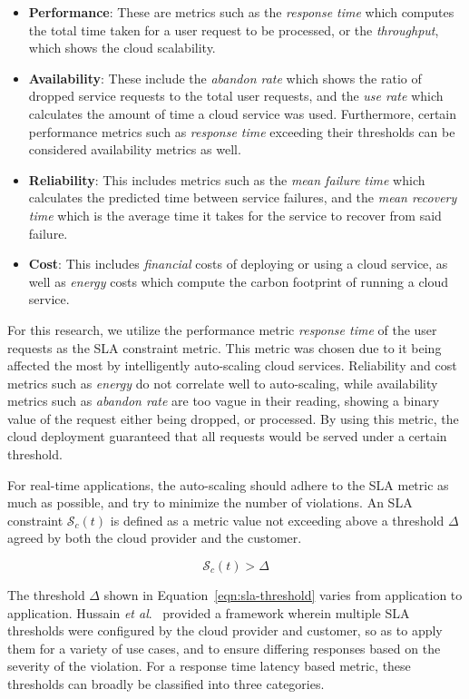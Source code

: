 \begin{itemize}
    \item \textbf{Performance}: These are metrics such as the \textit{response time} which computes the total time taken for a user request to be processed, or the \textit{throughput}, which shows the cloud scalability.
    \item \textbf{Availability}: These include the \textit{abandon rate} which shows the ratio of dropped service requests to the total user requests, and the \textit{use rate} which calculates the amount of time a cloud service was used. Furthermore, certain performance metrics such as \textit{response time} exceeding their thresholds can be considered availability metrics as well.
    \item \textbf{Reliability}: This includes metrics such as the \textit{mean failure time} which calculates the predicted time between service failures, and the \textit{mean recovery time} which is the average time it takes for the service to recover from said failure.
    \item \textbf{Cost}: This includes \textit{financial} costs of deploying or using a cloud service, as well as \textit{energy} costs which compute the carbon footprint of running a cloud service.
\end{itemize}

For this research, we utilize the performance metric \textit{response time} of the user requests as the SLA constraint metric. This metric was chosen due to it being affected the most by intelligently auto-scaling cloud services. Reliability and cost metrics such as \textit{energy} do not correlate well to auto-scaling, while availability metrics such as \textit{abandon rate} are too vague in their reading, showing a binary value of the request either being dropped, or processed. By using this metric, the cloud deployment guaranteed that all requests would be served under a certain threshold.

For real-time applications, the auto-scaling should adhere to the SLA metric as much as possible, and try to minimize the number of violations. An SLA constraint $\mathcal{S}_{c}(t)$ is defined as a metric value not exceeding above a threshold $\Delta$ agreed by both the cloud provider and the customer.

\begin{equation}
    \mathcal{S}_{c}(t) > \Delta
    \label{eqn:sla-threshold}
\end{equation}

The threshold $\Delta$ shown in Equation~\ref{eqn:sla-threshold} varies from application to application. Hussain \textit{et al}.~\cite{hussain2016sla} provided a framework wherein multiple SLA thresholds were configured by the cloud provider and customer, so as to apply them for a variety of use cases, and to ensure differing responses based on the severity of the violation. For a response time latency based metric, these thresholds can broadly be classified into three categories.

